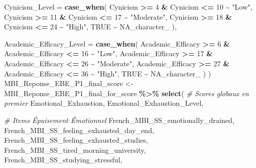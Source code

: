 \documentclass[
]{article}
\newenvironment{Shaded}{\begin{snugshade}}{\end{snugshade}}
\newcommand{\AttributeTok}[1]{\textcolor[rgb]{0.13,0.29,0.53}{#1}}
\newcommand{\CommentTok}[1]{\textcolor[rgb]{0.56,0.35,0.01}{\textit{#1}}}
\newcommand{\ConstantTok}[1]{\textcolor[rgb]{0.56,0.35,0.01}{#1}}
\newcommand{\DecValTok}[1]{\textcolor[rgb]{0.00,0.00,0.81}{#1}}
\newcommand{\FunctionTok}[1]{\textcolor[rgb]{0.13,0.29,0.53}{\textbf{#1}}}
\newcommand{\NormalTok}[1]{#1}
\newcommand{\OtherTok}[1]{\textcolor[rgb]{0.56,0.35,0.01}{#1}}
\newcommand{\SpecialCharTok}[1]{\textcolor[rgb]{0.81,0.36,0.00}{\textbf{#1}}}
\newcommand{\StringTok}[1]{\textcolor[rgb]{0.31,0.60,0.02}{#1}}
\begin{document}
\begin{Shaded}
\begin{Highlighting}[]
    \AttributeTok{Cynicism\_Level =} \FunctionTok{case\_when}\NormalTok{(}
\NormalTok{      Cynicism }\SpecialCharTok{\textgreater{}=} \DecValTok{4}  \SpecialCharTok{\&}\NormalTok{ Cynicism }\SpecialCharTok{\textless{}=} \DecValTok{10} \SpecialCharTok{\textasciitilde{}} \StringTok{"Low"}\NormalTok{,}
\NormalTok{      Cynicism }\SpecialCharTok{\textgreater{}=} \DecValTok{11} \SpecialCharTok{\&}\NormalTok{ Cynicism }\SpecialCharTok{\textless{}=} \DecValTok{17} \SpecialCharTok{\textasciitilde{}} \StringTok{"Moderate"}\NormalTok{,}
\NormalTok{      Cynicism }\SpecialCharTok{\textgreater{}=} \DecValTok{18} \SpecialCharTok{\&}\NormalTok{ Cynicism }\SpecialCharTok{\textless{}=} \DecValTok{24} \SpecialCharTok{\textasciitilde{}} \StringTok{"High"}\NormalTok{,}
      \ConstantTok{TRUE} \SpecialCharTok{\textasciitilde{}} \ConstantTok{NA\_character\_}
\NormalTok{    ),}
    
    \AttributeTok{Academic\_Efficacy\_Level =} \FunctionTok{case\_when}\NormalTok{(}
\NormalTok{      Academic\_Efficacy }\SpecialCharTok{\textgreater{}=} \DecValTok{6}  \SpecialCharTok{\&}\NormalTok{ Academic\_Efficacy }\SpecialCharTok{\textless{}=} \DecValTok{16} \SpecialCharTok{\textasciitilde{}} \StringTok{"Low"}\NormalTok{,}
\NormalTok{      Academic\_Efficacy }\SpecialCharTok{\textgreater{}=} \DecValTok{17} \SpecialCharTok{\&}\NormalTok{ Academic\_Efficacy }\SpecialCharTok{\textless{}=} \DecValTok{26} \SpecialCharTok{\textasciitilde{}} \StringTok{"Moderate"}\NormalTok{,}
\NormalTok{      Academic\_Efficacy }\SpecialCharTok{\textgreater{}=} \DecValTok{27} \SpecialCharTok{\&}\NormalTok{ Academic\_Efficacy }\SpecialCharTok{\textless{}=} \DecValTok{36} \SpecialCharTok{\textasciitilde{}} \StringTok{"High"}\NormalTok{,}
      \ConstantTok{TRUE} \SpecialCharTok{\textasciitilde{}} \ConstantTok{NA\_character\_}
\NormalTok{    )}
\NormalTok{  )}
\NormalTok{MBI\_Reponse\_EBE\_P1\_final\_score }\OtherTok{\textless{}{-}}
\NormalTok{  MBI\_Reponse\_EBE\_P1\_final\_for\_score }\SpecialCharTok{\%\textgreater{}\%}
  \FunctionTok{select}\NormalTok{(}
    \CommentTok{\# Scores globaux en premier}
\NormalTok{    Emotional\_Exhaustion,}
\NormalTok{    Emotional\_Exhaustion\_Level,}
    
    
    \CommentTok{\# Items Épuisement Émotionnel}
\NormalTok{    French\_MBI\_SS\_emotionally\_drained,}
\NormalTok{    French\_MBI\_SS\_feeling\_exhausted\_day\_end,}
\NormalTok{    French\_MBI\_SS\_feeling\_exhausted\_studies,}
\NormalTok{    French\_MBI\_SS\_tired\_morning\_university,}
\NormalTok{    French\_MBI\_SS\_studying\_stressful,}
    

\end{Highlighting}
\end{Shaded}
\end{document}
